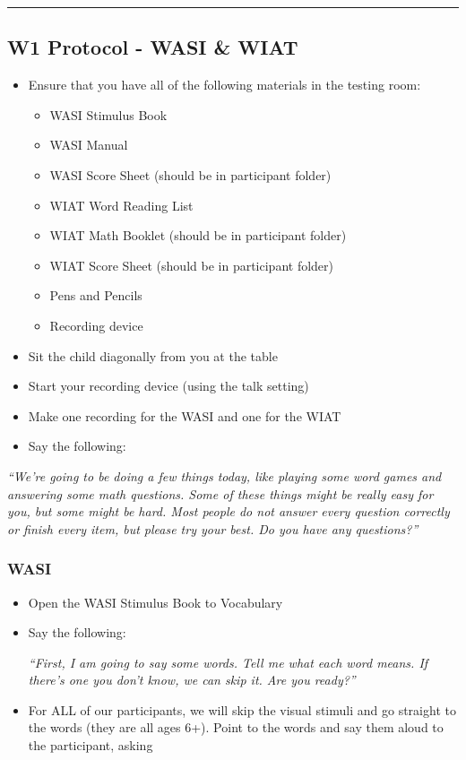 \documentclass[]{book}
\providecommand{\tightlist}{%
  \setlength{\itemsep}{0pt}\setlength{\parskip}{0pt}}
\begin{document}
\begin{center}\rule{0.5\linewidth}{0.5pt}\end{center}

\hypertarget{w1-protocol---wasi-wiat}{%
\subsection{W1 Protocol - WASI \& WIAT}\label{w1-protocol---wasi-wiat}}

\begin{itemize}
\tightlist
\item
  Ensure that you have all of the following materials in the testing room:

  \begin{itemize}
  \tightlist
  \item
    WASI Stimulus Book
  \item
    WASI Manual
  \item
    WASI Score Sheet (should be in participant folder)
  \item
    WIAT Word Reading List
  \item
    WIAT Math Booklet (should be in participant folder)
  \item
    WIAT Score Sheet (should be in participant folder)
  \item
    Pens and Pencils
  \item
    Recording device
  \end{itemize}
\item
  Sit the child diagonally from you at the table
\item
  Start your recording device (using the talk setting)
\item
  Make one recording for the WASI and one for the WIAT
\item
  Say the following:
\end{itemize}

\emph{``We're going to be doing a few things today, like playing some word games and answering some math questions. Some of these things might be really easy for you, but some might be hard. Most people do not answer every question correctly or finish every item, but please try your best. Do you have any questions?''}

\hypertarget{wasi-1}{%
\subsubsection{WASI}\label{wasi-1}}

\begin{itemize}
\item
  Open the WASI Stimulus Book to Vocabulary
\item
  Say the following:

  \emph{``First, I am going to say some words. Tell me what each word means.
  If there's one you don't know, we can skip it. Are you ready?''}
\item
  For ALL of our participants, we will skip the visual stimuli and go straight to the words (they are all ages 6+). Point to the words and say them aloud to the participant, asking
\end{itemize}
\end{document}
